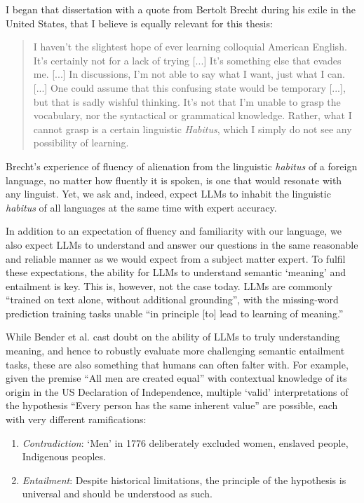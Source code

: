 \documentclass[12pt,twoside]{report}
\begin{document}
I began that dissertation with a quote from Bertolt Brecht during his exile in the United States, that I believe is equally relevant for this thesis:
\begin{quote}
    I haven't the slightest hope of ever learning colloquial American English. It's certainly not for a lack of trying [...] It's something else that evades me. [...] In discussions, I'm not able to say what I want, just what I can. [...] One could assume that this confusing state would be temporary [...], but that is sadly wishful thinking. It's not that I'm unable to grasp the vocabulary, nor the syntactical or grammatical knowledge. Rather, what I cannot grasp is a certain linguistic \textit{Habitus}, which I simply do not see any possibility of learning.\cite{brecht}
\end{quote}

Brecht's experience of fluency of alienation from the linguistic \textit{habitus} of a foreign language, no matter how fluently it is spoken, is one that would resonate with any linguist. Yet, we ask and, indeed, expect LLMs to inhabit the linguistic \textit{habitus} of all languages at the same time with expert accuracy. \newline \par

In addition to an expectation of fluency and familiarity with our language, we also expect LLMs to understand and answer our questions in the same reasonable and reliable manner as we would expect from a subject matter expert. To fulfil these expectations, the ability for LLMs to understand semantic `meaning' and entailment is key. This is, however, not the case today. LLMs are commonly ``trained on text alone, without additional grounding''\cite{merrill-etal-2022-entailment}, with the missing-word prediction training tasks unable ``in principle [to] lead to learning of meaning.''\cite{bender-koller-2020-climbing} \newline \par 
While Bender et al. cast doubt on the ability of LLMs to truly understanding meaning, and hence to robustly evaluate more challenging semantic entailment tasks, these are also something that humans can often falter with. For example, given the premise ``All men are created equal'' with contextual knowledge of its origin in the US Declaration of Independence, multiple `valid' interpretations of the hypothesis ``Every person has the same inherent value'' are possible, each with very different ramifications:
\begin{enumerate}[itemsep=0pt]
    \item \textit{Contradiction}: `Men' in 1776 deliberately excluded women, enslaved people, Indigenous peoples.
    \item \textit{Entailment}: Despite historical limitations, the principle of the hypothesis is universal and should be understood as such.
\end{enumerate}
\end{document}
